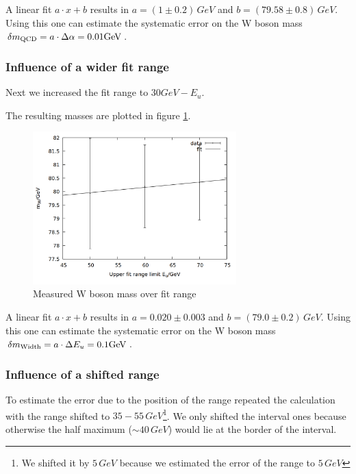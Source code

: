 A linear fit $a\cdot x + b$ results in $a = (1 \pm 0.2)\,\si{GeV}$ and $b = (79.58 \pm 0.8) \, \si{GeV}$. Using this one can estimate the systematic error on the W boson mass $\delta m\ind{QCD} = a \cdot \Delta\alpha = 0.01 \si{GeV}$. 

\subsubsection{Influence of a wider fit range}

Next we increased the fit range to $30 \si{GeV} - E_u$.  

The resulting masses are plotted in figure \ref{fig:task3_range}.

\begin{figure}
\centering
\includegraphics[width=0.7\textwidth]{data/range.png}
\caption{Measured W boson mass over fit range}
\label{fig:task3_range}
\end{figure}

A linear fit $a\cdot x + b$ results in $a = 0.020 \pm 0.003$ and $b = (79.0 \pm 0.2) \,\si{GeV}$. Using this one can estimate the systematic error on the W boson mass $\delta m\ind{Width} = a \cdot \Delta E_u = 0.1 \si{GeV}$. 

\subsubsection{Influence of a shifted range}
To estimate the error due to the position of the range repeated the calculation with the range shifted to $35 - 55\,\si{GeV}$\footnote{We shifted it by $5\,\si{GeV}$ because we estimated the error of the range to $5\,\si{GeV}$}. We only shifted the interval ones because otherwise the half maximum ($\sim 40\,\si{GeV}$) would lie at the border of the interval.\\


